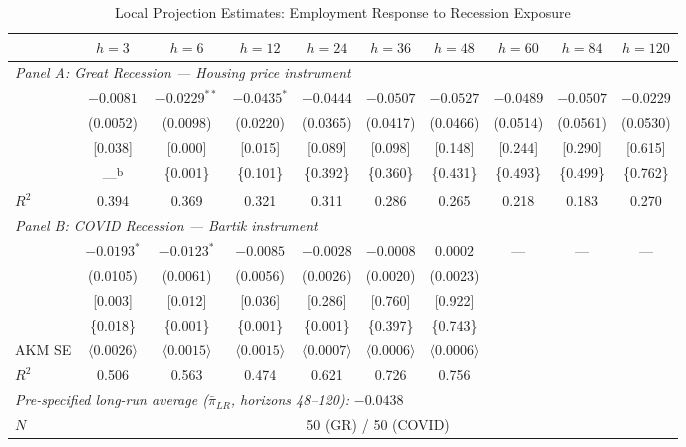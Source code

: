 \begin{table}[H]
\centering
\caption{Local Projection Estimates: Employment Response to Recession Exposure}
\begin{threeparttable}
\small
\begin{tabular}{lccccccccc}
\toprule
& $h=3$ & $h=6$ & $h=12$ & $h=24$ & $h=36$ & $h=48$ & $h=60$ & $h=84$ & $h=120$ \\
\midrule
\multicolumn{10}{l}{\textit{Panel A: Great Recession --- Housing price instrument}} \\[3pt]
& $-0.0081$ & $-0.0229^{**}$ & $-0.0435^{*}$ & $-0.0444$ & $-0.0507$ & $-0.0527$ & $-0.0489$ & $-0.0507$ & $-0.0229$ \\
& (0.0052) & (0.0098) & (0.0220) & (0.0365) & (0.0417) & (0.0466) & (0.0514) & (0.0561) & (0.0530) \\
& [0.038] & [0.000] & [0.015] & [0.089] & [0.098] & [0.148] & [0.244] & [0.290] & [0.615] \\
& ---\textsuperscript{b} & \{0.001\} & \{0.101\} & \{0.392\} & \{0.360\} & \{0.431\} & \{0.493\} & \{0.499\} & \{0.762\} \\
$R^2$ & 0.394 & 0.369 & 0.321 & 0.311 & 0.286 & 0.265 & 0.218 & 0.183 & 0.270  \\
\midrule
\multicolumn{10}{l}{\textit{Panel B: COVID Recession --- Bartik instrument}} \\[3pt]
& $-0.0193^{*}$ & $-0.0123^{*}$ & $-0.0085$ & $-0.0028$ & $-0.0008$ & $0.0002$ & --- & --- & --- \\
& (0.0105) & (0.0061) & (0.0056) & (0.0026) & (0.0020) & (0.0023) & & & \\
& [0.003] & [0.012] & [0.036] & [0.286] & [0.760] & [0.922] & & & \\
& \{0.018\} & \{0.001\} & \{0.001\} & \{0.001\} & \{0.397\} & \{0.743\} & & & \\
AKM SE & $\langle0.0026\rangle$ & $\langle0.0015\rangle$ & $\langle0.0015\rangle$ & $\langle0.0007\rangle$ & $\langle0.0006\rangle$ & $\langle0.0006\rangle$ & & & \\
$R^2$ & 0.506 & 0.563 & 0.474 & 0.621 & 0.726 & 0.756 & & &  \\
\midrule
\multicolumn{10}{l}{\textit{Pre-specified long-run average ($\bar{\pi}_{LR}$, horizons 48--120):} $-0.0438$} \\
$N$ & \multicolumn{9}{c}{50 (GR) / 50 (COVID)} \\
\bottomrule
\end{tabular}
\begin{tablenotes}[flushleft]
\small

\end{tablenotes}
\end{threeparttable}
\end{table}
